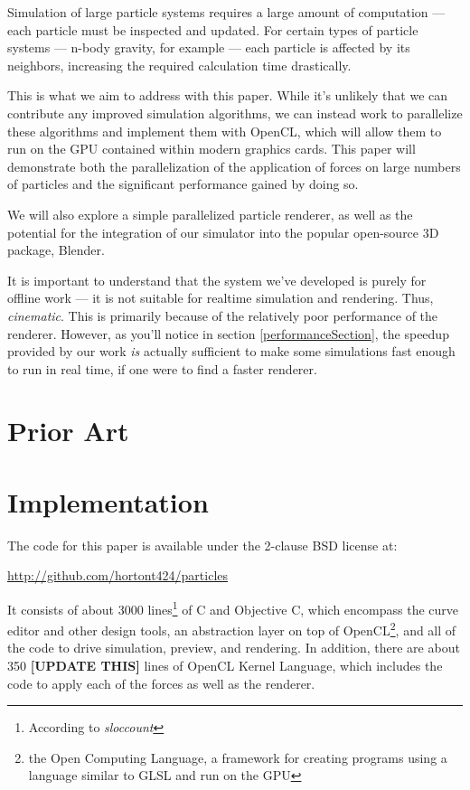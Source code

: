 \documentclass{acmsiggraph}
\begin{document}
Simulation of large particle systems requires a large amount of computation --- each particle must be inspected and updated. For certain types of particle systems --- n-body gravity, for example --- each particle is affected by its neighbors, increasing the required calculation time drastically.

This is what we aim to address with this paper. While it's unlikely that we can contribute any improved simulation algorithms, we can instead work to parallelize these algorithms and implement them with OpenCL, which will allow them to run on the GPU contained within modern graphics cards. This paper will demonstrate both the parallelization of the application of forces on large numbers of particles and the significant performance gained by doing so.

We will also explore a simple parallelized particle renderer, as well as the potential for the integration of our simulator into the popular open-source 3D package, Blender.

It is important to understand that the system we've developed is purely for offline work --- it is not suitable for realtime simulation and rendering. Thus, {\it cinematic}. This is primarily because of the relatively poor performance of the renderer. However, as you'll notice in section \ref{performanceSection}, the speedup provided by our work {\it is} actually sufficient to make some simulations fast enough to run in real time, if one were to find a faster renderer.

\section{Prior Art}

\section{Implementation}

The code for this paper is available under the 2-clause BSD license at:

\url{http://github.com/hortont424/particles}

It consists of about 3000 lines\footnote{According to {\it sloccount}} of C and Objective C, which encompass the curve editor and other design tools, an abstraction layer on top of OpenCL\footnote{the Open Computing Language, a framework for creating programs using a language similar to GLSL and run on the GPU}, and all of the code to drive simulation, preview, and rendering. In addition, there are about 350 {\bf [UPDATE THIS]} lines of OpenCL Kernel Language, which includes the code to apply each of the forces as well as the renderer.
\end{document}
